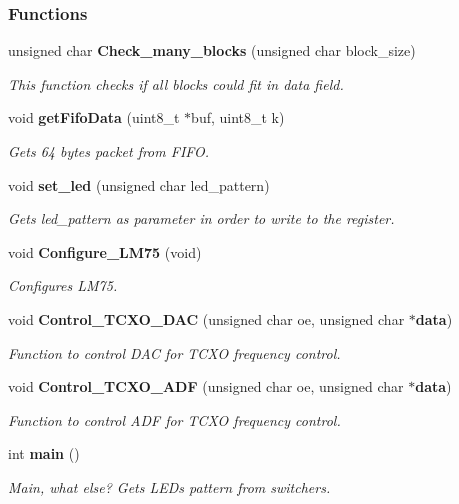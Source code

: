 \subsubsection*{Functions}
\begin{DoxyCompactItemize}
\item 
unsigned char {\bf Check\+\_\+many\+\_\+blocks} (unsigned char block\+\_\+size)
\begin{DoxyCompactList}\small\item\em This function checks if all blocks could fit in data field. \end{DoxyCompactList}\item 
void {\bf get\+Fifo\+Data} (uint8\+\_\+t $\ast$buf, uint8\+\_\+t k)
\begin{DoxyCompactList}\small\item\em Gets 64 bytes packet from F\+I\+FO. \end{DoxyCompactList}\item 
void {\bf set\+\_\+led} (unsigned char led\+\_\+pattern)
\begin{DoxyCompactList}\small\item\em Gets led\+\_\+pattern as parameter in order to write to the register. \end{DoxyCompactList}\item 
void {\bf Configure\+\_\+\+L\+M75} (void)
\begin{DoxyCompactList}\small\item\em Configures L\+M75. \end{DoxyCompactList}\item 
void {\bf Control\+\_\+\+T\+C\+X\+O\+\_\+\+D\+AC} (unsigned char oe, unsigned char $\ast${\bf data})
\begin{DoxyCompactList}\small\item\em Function to control D\+AC for T\+C\+XO frequency control. \end{DoxyCompactList}\item 
void {\bf Control\+\_\+\+T\+C\+X\+O\+\_\+\+A\+DF} (unsigned char oe, unsigned char $\ast${\bf data})
\begin{DoxyCompactList}\small\item\em Function to control A\+DF for T\+C\+XO frequency control. \end{DoxyCompactList}\item 
int {\bf main} ()
\begin{DoxyCompactList}\small\item\em Main, what else? Gets L\+E\+Ds pattern from switchers. \end{DoxyCompactList}\end{DoxyCompactItemize}
